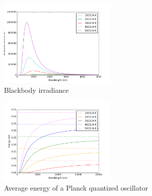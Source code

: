 \documentclass[11pt]{article}
\begin{document}
\begin{figure}[htbp]
\centering
\includegraphics[width=0.5\textwidth]{./Images/BlackBody.png}
\caption{Blackbody irradiance}
\end{figure}
\begin{figure}[htbp]
\centering
\includegraphics[width=0.5\textwidth]{./Images/Planck.png}
\caption{Average energy of a Planck quantized oscillator}
\end{figure}
\end{document}
